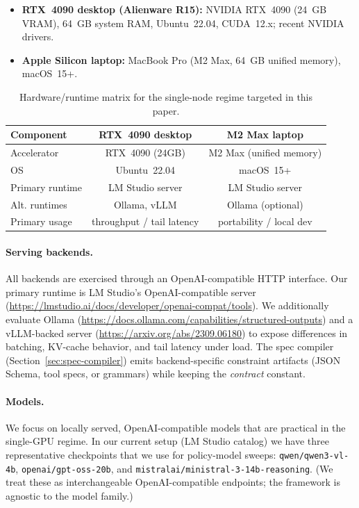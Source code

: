 \documentclass[11pt]{article}
\begin{document}
\begin{itemize}[leftmargin=12pt]
    \item \textbf{RTX~4090 desktop (Alienware R15):} NVIDIA RTX~4090 (24~GB VRAM), 64~GB system RAM, Ubuntu~22.04, CUDA~12.x; recent NVIDIA drivers.
    \item \textbf{Apple Silicon laptop:} MacBook Pro (M2 Max, 64~GB unified memory), macOS~15+.
\end{itemize}

\begin{table}[t]
\centering
\small
\begin{tabular}{@{}lcc@{}}
\toprule
\textbf{Component} & \textbf{RTX~4090 desktop} & \textbf{M2 Max laptop} \\
\midrule
Accelerator & RTX~4090 (24GB) & M2 Max (unified memory) \\
OS & Ubuntu~22.04 & macOS~15+ \\
Primary runtime & LM Studio server & LM Studio server \\
Alt. runtimes & Ollama, vLLM & Ollama (optional) \\
Primary usage & throughput / tail latency & portability / local dev \\
\bottomrule
\end{tabular}
\caption{Hardware/runtime matrix for the single-node regime targeted in this paper.}
\label{tab:hw-matrix}
\end{table}

\paragraph{Serving backends.}
All backends are exercised through an OpenAI-compatible HTTP interface.
Our primary runtime is LM Studio’s OpenAI-compatible server (\url{https://lmstudio.ai/docs/developer/openai-compat/tools}).
We additionally evaluate Ollama (\url{https://docs.ollama.com/capabilities/structured-outputs}) and a vLLM-backed server (\url{https://arxiv.org/abs/2309.06180}) to expose differences in batching, KV-cache behavior, and tail latency under load.
The spec compiler (Section~\ref{sec:spec-compiler}) emits backend-specific constraint artifacts (JSON Schema, tool specs, or grammars) while keeping the \emph{contract} constant.

\paragraph{Models.}
We focus on locally served, OpenAI-compatible models that are practical in the single-GPU regime.
In our current setup (LM Studio catalog) we have three representative checkpoints that we use for policy-model sweeps:
\texttt{qwen/qwen3-vl-4b}, \texttt{openai/gpt-oss-20b}, and \texttt{mistralai/ministral-3-14b-reasoning}.
(We treat these as interchangeable OpenAI-compatible endpoints; the framework is agnostic to the model family.)
\end{document}
